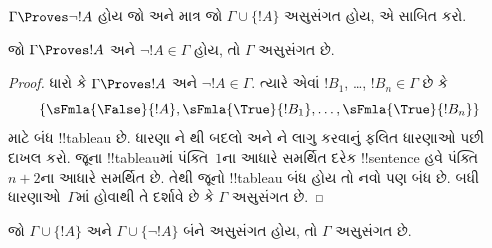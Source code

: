 \documentclass[../../../include/open-logic-section]{subfiles}
\begin{document}
\begin{prob}
$\Gamma \Proves \lnot !A$ હોય જો અને માત્ર જો
$\Gamma \cup \{!A\}$ અસુસંગત હોય, એ સાબિત કરો.
\end{prob}

\begin{prop}
  જો $\Gamma \Proves !A$ અને $\lnot !A \in \Gamma$ હોય, તો $\Gamma$
  અસુસંગત છે.
\end{prop}

\begin{proof}
  ધારો કે $\Gamma \Proves !A$ અને $\lnot !A \in \Gamma$. ત્યારે એવાં
  $!B_1$, \dots, $!B_n \in \Gamma$ છે કે
  \[
  \{\sFmla{\False}{!A}, \sFmla{\True}{!B_1}, \dots, \sFmla{\True}{!B_n}\}
  \]
  માટે બંધ !!{tableau} છે. ધારણા ને
  થી બદલો અને ને
  \TRule{\True}{\lnot} લાગુ કરવાનું ફલિત ધારણાઓ પછી દાખલ કરો. જૂના
  !!{tableau}માં પંક્તિ~$1$ના આધારે સમર્થિત દરેક !!{sentence} હવે
  પંક્તિ~$n+2$ના આધારે સમર્થિત છે. તેથી જૂનો !!{tableau} બંધ હોય તો
  નવો પણ બંધ છે. બધી ધારણાઓ~$\Gamma$માં હોવાથી તે દર્શાવે છે કે
  $\Gamma$ અસુસંગત છે.
\end{proof}

\begin{prop}
  જો $\Gamma \cup \{!A\}$ અને $\Gamma \cup \{\lnot !A\}$ બંને
  અસુસંગત હોય, તો $\Gamma$ અસુસંગત છે.
\end{prop}
\end{document}
